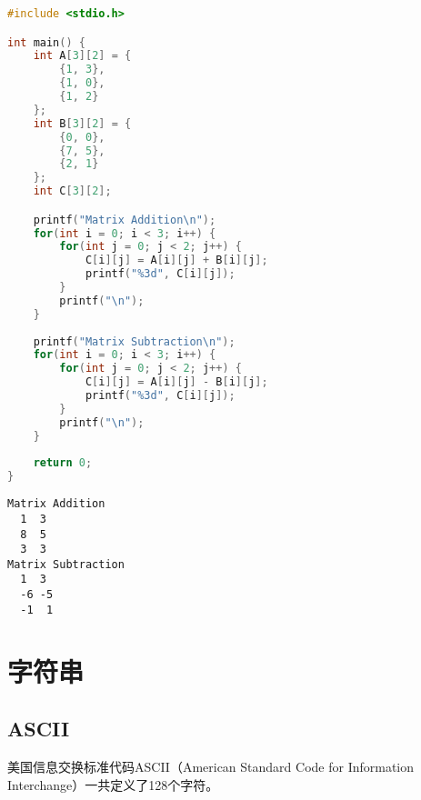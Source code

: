 \begin{lstlisting}[language=C]
#include <stdio.h>

int main() {
	int A[3][2] = {
		{1, 3},
		{1, 0},
		{1, 2}
	};
	int B[3][2] = {
		{0, 0},
		{7, 5},
		{2, 1}
	};
	int C[3][2];

	printf("Matrix Addition\n");
	for(int i = 0; i < 3; i++) {
		for(int j = 0; j < 2; j++) {
			C[i][j] = A[i][j] + B[i][j];
			printf("%3d", C[i][j]);
		}
		printf("\n");
	}
	
	printf("Matrix Subtraction\n");
	for(int i = 0; i < 3; i++) {
		for(int j = 0; j < 2; j++) {
			C[i][j] = A[i][j] - B[i][j];
			printf("%3d", C[i][j]);
		}
		printf("\n");
	}
	
	return 0;
}
\end{lstlisting}

\begin{tcolorbox}
	\begin{verbatim}
Matrix Addition
  1  3
  8  5
  3  3
Matrix Subtraction
  1  3
  -6 -5
  -1  1
	\end{verbatim}
\end{tcolorbox}

\newpage

\section{字符串}

\subsection{ASCII}

美国信息交换标准代码ASCII（American Standard Code for Information Interchange）一共定义了128个字符。\\

